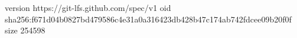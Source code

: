 version https://git-lfs.github.com/spec/v1
oid sha256:f671d04b0827bd479586c4e31a0a316423db428b47c174ab742fdcee09b20f0f
size 254598
